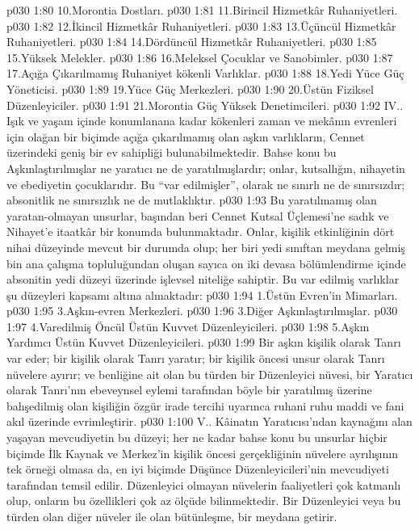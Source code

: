 \vs p030 1:80 10.\bibnobreakspace Morontia Dostları.
\vs p030 1:81 11.\bibnobreakspace Birincil Hizmetkâr Ruhaniyetleri.
\vs p030 1:82 12.\bibnobreakspace İkincil Hizmetkâr Ruhaniyetleri.
\vs p030 1:83 13.\bibnobreakspace Üçüncül Hizmetkâr Ruhaniyetleri.
\vs p030 1:84 14.\bibnobreakspace Dördüncül Hizmetkâr Ruhaniyetleri.
\vs p030 1:85 15.\bibnobreakspace Yüksek Melekler.
\vs p030 1:86 16.\bibnobreakspace Meleksel Çocuklar ve Sanobimler.
\vs p030 1:87 17.\bibnobreakspace Açığa Çıkarılmamış Ruhaniyet kökenli Varlıklar.
\vs p030 1:88 18.\bibnobreakspace Yedi Yüce Güç Yöneticisi.
\vs p030 1:89 19.\bibnobreakspace Yüce Güç Merkezleri.
\vs p030 1:90 20.\bibnobreakspace Üstün Fiziksel Düzenleyiciler.
\vs p030 1:91 21.\bibnobreakspace Morontia Güç Yüksek Denetimcileri.
\vs p030 1:92 IV.\bibnobreakspace {}. Işık ve yaşam içinde konumlanana kadar kökenleri zaman ve mekânın evrenleri için olağan bir biçimde açığa çıkarılmamış olan aşkın varlıkların, Cennet üzerindeki geniş bir ev sahipliği bulunabilmektedir. Bahse konu bu Aşkınlaştırılmışlar ne yaratıcı ne de yaratılmışlardır; onlar, kutsallığın, nihayetin ve ebediyetin  çocuklarıdır. Bu “var edilmişler”,  olarak ne sınırlı ne de sınırsızdır; absonitlik ne sınırsızlık ne de mutlaklıktır.
\vs p030 1:93 Bu yaratılmamış olan yaratan\hyp{}olmayan unsurlar, başından beri Cennet Kutsal Üçlemesi’ne sadık ve Nihayet’e itaatkâr bir konumda bulunmaktadır. Onlar, kişilik etkinliğinin dört nihai düzeyinde mevcut bir durumda olup; her biri yedi sınıftan meydana gelmiş bin ana çalışma topluluğundan oluşan sayıca on iki devasa bölümlendirme içinde absonitin yedi düzeyi üzerinde işlevsel niteliğe sahiptir. Bu var edilmiş varlıklar şu düzeyleri kapsamı altına almaktadır:
\vs p030 1:94 1.\bibnobreakspace Üstün Evren’in Mimarları.
\vs p030 1:95 3.\bibnobreakspace Aşkın\hyp{}evren Merkezleri.
\vs p030 1:96 3.\bibnobreakspace Diğer Aşkınlaştırılmışlar.
\vs p030 1:97 4.\bibnobreakspace Varedilmiş Öncül Üstün Kuvvet Düzenleyicileri.
\vs p030 1:98 5.\bibnobreakspace Aşkın Yardımcı Üstün Kuvvet Düzenleyicileri.
\vs p030 1:99 Bir aşkın kişilik olarak Tanrı var eder; bir kişilik olarak Tanrı yaratır; bir kişilik öncesi unsur olarak Tanrı nüvelere ayırır; ve benliğine ait olan bu türden bir Düzenleyici nüvesi, bir Yaratıcı olarak Tanrı’nın ebeveynsel eylemi tarafından böyle bir yaratılmış üzerine bahşedilmiş olan kişiliğin özgür irade tercihi uyarınca ruhani ruhu maddi ve fani akıl üzerinde evrimleştirir.
\vs p030 1:100 V.\bibnobreakspace {}. Kâinatın Yaratıcısı’ndan kaynağını alan yaşayan mevcudiyetin bu düzeyi; her ne kadar bahse konu bu unsurlar hiçbir biçimde İlk Kaynak ve Merkez’in kişilik öncesi gerçekliğinin nüvelere ayrılışının tek örneği olmasa da, en iyi biçimde Düşünce Düzenleyicileri’nin mevcudiyeti tarafından temsil edilir. Düzenleyici olmayan nüvelerin faaliyetleri çok katmanlı olup, onların bu özellikleri çok az ölçüde bilinmektedir. Bir Düzenleyici veya bu türden olan diğer nüveler ile olan bütünleşme, bir  meydana getirir.
